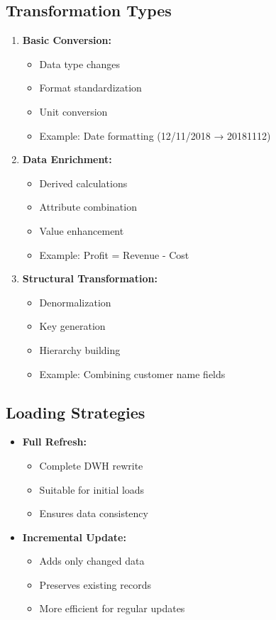 \subsection{Transformation Types}
\begin{enumerate}
    \item \textbf{Basic Conversion:}
        \begin{itemize}
            \item Data type changes
            \item Format standardization
            \item Unit conversion
            \item Example: Date formatting (12/11/2018 → 20181112)
        \end{itemize}
    \item \textbf{Data Enrichment:}
        \begin{itemize}
            \item Derived calculations
            \item Attribute combination
            \item Value enhancement
            \item Example: Profit = Revenue - Cost
        \end{itemize}
    \item \textbf{Structural Transformation:}
        \begin{itemize}
            \item Denormalization
            \item Key generation
            \item Hierarchy building
            \item Example: Combining customer name fields
        \end{itemize}
\end{enumerate}

\subsection{Loading Strategies}
\begin{itemize}
    \item \textbf{Full Refresh:}
        \begin{itemize}
            \item Complete DWH rewrite
            \item Suitable for initial loads
            \item Ensures data consistency
        \end{itemize}
    \item \textbf{Incremental Update:}
        \begin{itemize}
            \item Adds only changed data
            \item Preserves existing records
            \item More efficient for regular updates
        \end{itemize}
\end{itemize}

